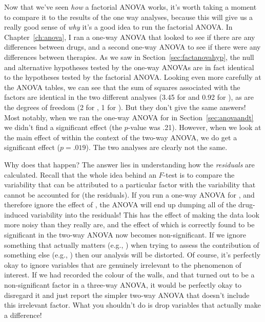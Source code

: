 
Now that we've seen {\it how} a factorial ANOVA works, it's worth taking a moment to compare it to the results of the one way analyses, because this will give us a really good sense of {\it why} it's a good idea to run the factorial ANOVA. In Chapter~\ref{ch:anova}, I ran a one-way ANOVA that looked to see if there are any differences between drugs, and a second one-way ANOVA to see if there were any differences between therapies. As we saw in Section~\ref{sec:factanovahyp}, the null and alternative hypotheses tested by the one-way ANOVAs are in fact identical to the hypotheses tested by the factorial ANOVA. Looking even more carefully at the ANOVA tables, we can see that the sum of squares associated with the factors are identical in the two different analyses (3.45 for  and 0.92 for ), as are the degrees of freedom (2 for , 1 for ). But they don't give the same answers! Most notably, when we ran the one-way ANOVA for  in Section~\ref{sec:anovaandt} we didn't find a significant effect (the $p$-value was .21). However, when we look at the main effect of  within the context of the two-way ANOVA, we do get a significant effect ($p=.019$). The two analyses are clearly not the same.

Why does that happen? The answer lies in understanding how the {\it residuals} are calculated. Recall that the whole idea behind an $F$-test is to compare the variability that can be attributed to a particular factor with the variability that cannot be accounted for (the residuals). If you run a one-way ANOVA for , and therefore ignore the effect of , the ANOVA will end up dumping all of the drug-induced variability into the residuals! This has the effect of making the data look more noisy than they really are, and the effect of  which is correctly found to be significant in the two-way ANOVA now becomes non-significant. If we ignore something that actually matters (e.g., ) when trying to assess the contribution of something else (e.g., ) then our analysis will be distorted. Of course, it's perfectly okay to ignore variables that are genuinely irrelevant to the phenomenon of interest. If we had recorded the colour of the walls, and that turned out to be a non-significant factor in a three-way ANOVA, it would be perfectly okay to disregard it and just report the simpler two-way ANOVA that doesn't include this irrelevant factor. What you shouldn't do is drop variables that actually make a difference! 

